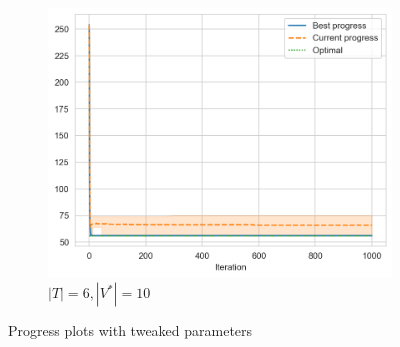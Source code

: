 \begin{figure}[ht]
\begin{subfigure}{0.3\textwidth}
        \centering
        \includegraphics[width=\textwidth]{../images/p2/large-incr.png}
        \caption{\(|T| = 6, |V^*| = 10\)}
    \end{subfigure}
    \hfill
    \caption{Progress plots with tweaked parameters}
    \label{fig:p2-tweaked}
\end{figure}
